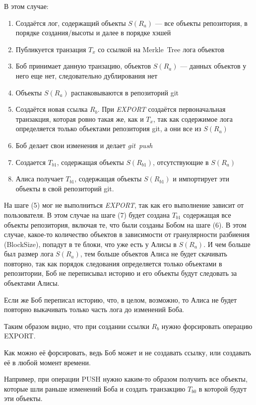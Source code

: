 \documentclass[11pt,a4paper]{article}
\begin{document}
В этом случае:


\begin{enumerate}
  \item Создаётся лог, содержащий объекты $S(R_a)$ --- все объекты репозитория,
        в порядке создания/высоты и далее в порядке хэшей
  \item Публикуется транзация $T_x$ со ссылкой на Merkle~Tree лога объектов
  \item Боб принимает данную транзацию, объектов $S(R_a)$ --- данных объектов
        у него еще нет, следовательно дублирования нет
  \item Объекты $S(R_a)$ распаковываются в репозиторий git
  \item Создаётся новая ссылка $R_b$. При \textit{EXPORT} создаётся
        первоначальная транзакция, которая ровно такая же, как и $T_x$,
        так как содержимое лога определяется только объектами репозитория git,
        а они все из $S(R_a)$
  \item Боб делает свои изменения и делает \textit{git~push}
  \item Создается $T_{b1}$, содержащая объекты $S(R_{b1})$, отсутствующие в
        $S(R_a)$
  \item Алиса получает $T_{b1}$, содержащая объекты $S(R_{b1})$ и импортирует
        эти объекты в свой репозиторий git.
\end{enumerate}

На шаге (5) мог не выполниться \textit{EXPORT}, так как его выполнение зависит
от пользователя. В этом случае на шаге (7) будет создана $T_{b1}$ содержащая все
объекты репозитория, включая те, что были созданы Бобом на шаге (6). В этом
случае, какое-то количество объектов в зависимости от гранулярности разбиения
(BlockSize), попадут в те блоки, что уже есть у Алисы в $S(R_a)$. И чем больше
был размер лога $S(R_a)$, тем больше объектов Алиса не будет скачивать повторно,
так как порядок следования определяется только объектами в репозитории, Боб не
переписывал историю и его объекты будут следовать за объектами Алисы.

Если же Боб переписал историю, что, в целом, возможно, то Алиса не будет
повторно выкачивать только часть лога до изменений Боба.

Таким образом видно, что при создании ссылки $R_b$ нужно форсировать операцию
EXPORT.

Как можно её форсировать, ведь Боб может и не создавать ссылку, или создавать
её в любой момент времени.

Например, при операции PUSH нужно каким-то образом получить все объекты,
которые шли раньше изменений Боба и создать транзакцию $T_{b0}$ в которой
будут эти объекты.
\end{document}
